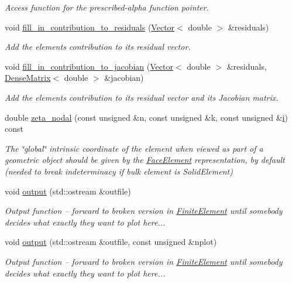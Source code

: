 \begin{DoxyCompactItemize}
\begin{DoxyCompactList}\small\item\em Access function for the prescribed-\/alpha function pointer. \end{DoxyCompactList}\item 
void \hyperlink{classoomph_1_1SteadyAxisymAdvectionDiffusionFluxElement_a8c35ea7bd3a41ea52cd8ed35268aaa35}{fill\+\_\+in\+\_\+contribution\+\_\+to\+\_\+residuals} (\hyperlink{classoomph_1_1Vector}{Vector}$<$ double $>$ \&residuals)
\begin{DoxyCompactList}\small\item\em Add the element\textquotesingle{}s contribution to its residual vector. \end{DoxyCompactList}\item 
void \hyperlink{classoomph_1_1SteadyAxisymAdvectionDiffusionFluxElement_aa23b0478cb2937ac6e0668136befac27}{fill\+\_\+in\+\_\+contribution\+\_\+to\+\_\+jacobian} (\hyperlink{classoomph_1_1Vector}{Vector}$<$ double $>$ \&residuals, \hyperlink{classoomph_1_1DenseMatrix}{Dense\+Matrix}$<$ double $>$ \&jacobian)
\begin{DoxyCompactList}\small\item\em Add the element\textquotesingle{}s contribution to its residual vector and its Jacobian matrix. \end{DoxyCompactList}\item 
double \hyperlink{classoomph_1_1SteadyAxisymAdvectionDiffusionFluxElement_a0aee153365d2f5e3cefac8b0ff38150b}{zeta\+\_\+nodal} (const unsigned \&n, const unsigned \&k, const unsigned \&\hyperlink{cfortran_8h_adb50e893b86b3e55e751a42eab3cba82}{i}) const
\begin{DoxyCompactList}\small\item\em The \char`\"{}global\char`\"{} intrinsic coordinate of the element when viewed as part of a geometric object should be given by the \hyperlink{classoomph_1_1FaceElement}{Face\+Element} representation, by default (needed to break indeterminacy if bulk element is Solid\+Element) \end{DoxyCompactList}\item 
void \hyperlink{classoomph_1_1SteadyAxisymAdvectionDiffusionFluxElement_a4cdff939f33cc6d4c8d5eb7d0728aa73}{output} (std\+::ostream \&outfile)
\begin{DoxyCompactList}\small\item\em Output function -- forward to broken version in \hyperlink{classoomph_1_1FiniteElement}{Finite\+Element} until somebody decides what exactly they want to plot here... \end{DoxyCompactList}\item 
void \hyperlink{classoomph_1_1SteadyAxisymAdvectionDiffusionFluxElement_ab3d29e1b0f31936338b1b3a828ea8d9b}{output} (std\+::ostream \&outfile, const unsigned \&nplot)
\begin{DoxyCompactList}\small\item\em Output function -- forward to broken version in \hyperlink{classoomph_1_1FiniteElement}{Finite\+Element} until somebody decides what exactly they want to plot here... \end{DoxyCompactList}\end{DoxyCompactItemize}
